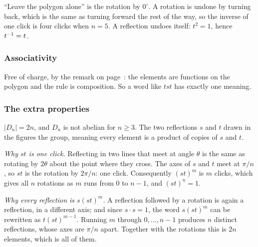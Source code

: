 ``Leave the polygon alone'' is the rotation by $0^\circ$. A rotation is undone by turning back, which
is the same as turning forward the rest of the way, so the inverse of one click is four clicks when
$n=5$. A reflection undoes itself: $t^2=1$, hence $t^{-1}=t$.



\subsubsection*{Associativity}

Free of charge, by the remark on page~\pageref{def:group}: the elements are functions on the polygon
and the rule is composition. So a word like $tst$ has exactly one meaning.

\subsubsection*{The extra properties}

$|D_n|=2n$, and $D_n$ is not abelian for $n\ge3$. The two reflections $s$ and $t$ drawn in the
figures  the group, meaning every element is a product of copies of $s$ and $t$.


\begin{why}
\emph{Why $st$ is one click.} Reflecting in two lines that meet at angle $\theta$ is the same as
rotating by $2\theta$ about the point where they cross. The axes of $s$ and $t$ meet at $\pi/n$, so
$st$ is the rotation by $2\pi/n$: one click. Consequently $(st)^m$ is $m$ clicks, which gives all
$n$ rotations as $m$ runs from $0$ to $n-1$, and $(st)^n=1$.
\end{why}

\begin{why}
\emph{Why every reflection is $s(st)^m$.} A reflection followed by a rotation is again a reflection,
in a different axis; and since $s\cdot s=1$, the word $s(st)^m$ can be rewritten as $t(st)^{m-1}$.
Running $m$ through $0,\dots,n-1$ produces $n$ distinct reflections, whose axes are $\pi/n$ apart.
Together with the rotations this is $2n$ elements, which is all of them.
\end{why}

